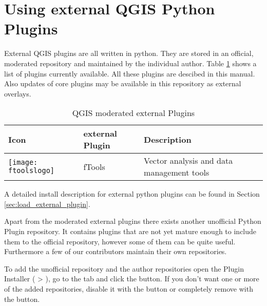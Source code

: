 
\section{Using external QGIS Python Plugins}\label{sec:external_plugins}

\updatedisclaimer

External QGIS plugins are all written in python. They are stored in 
an official, moderated repository and maintained by the individual 
author. Table \ref{tab:external_plugins} shows a list of plugins 
currently available. All these plugins are descibed in this manual.
Also updates of core plugins may be available in this repository as 
external overlays.

\begin{table}[H]
\centering
\caption{QGIS moderated external Plugins}\label{tab:external_plugins}\medskip
\small
 \begin{tabular}{|l|l|p{4in}|}
\hline \textbf{Icon} & \textbf{external Plugin} & \textbf{Description}\\
\hline
\texttt{[image: ftoolslogo]}
 & fTools \index{plugins!fTools} & Vector analysis and data management tools\\
\hline
\end{tabular}
\end{table}

A detailed install description for external python plugins can be found in 
Section \ref{sec:load_external_plugin}.


Apart from the moderated external plugins there exists another unofficial
Python Plugin repository. It contains plugins that are not yet mature
enough to include them to the official repository, however some of them
can be quite useful. Furthermore a few of our contributors maintain
their own repositories.

To add the unofficial repository and the author repositories open the 
Plugin Installer ( > ),
go to the  tab and click the 
button. If you don't want one or more of the added repositories, disable it with the
 button or completely remove with the  button.

\begin{Tip} \caption{\textsc{Add more external Plugins}}
\end{Tip}




